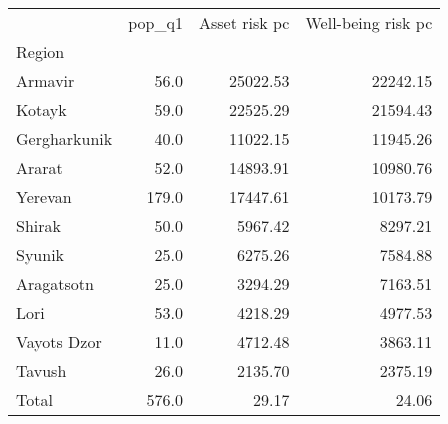 \begin{tabular}{lrrr}
\toprule
{} &  pop\_q1 &  Asset risk pc &  Well-being risk pc \\
Region       &         &                &                     \\
\midrule
Armavir      &    56.0 &       25022.53 &            22242.15 \\
Kotayk       &    59.0 &       22525.29 &            21594.43 \\
Gergharkunik &    40.0 &       11022.15 &            11945.26 \\
Ararat       &    52.0 &       14893.91 &            10980.76 \\
Yerevan      &   179.0 &       17447.61 &            10173.79 \\
Shirak       &    50.0 &        5967.42 &             8297.21 \\
Syunik       &    25.0 &        6275.26 &             7584.88 \\
Aragatsotn   &    25.0 &        3294.29 &             7163.51 \\
Lori         &    53.0 &        4218.29 &             4977.53 \\
Vayots Dzor  &    11.0 &        4712.48 &             3863.11 \\
Tavush       &    26.0 &        2135.70 &             2375.19 \\
Total        &   576.0 &          29.17 &               24.06 \\
\bottomrule
\end{tabular}
